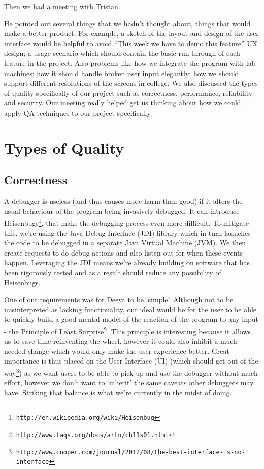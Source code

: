 \documentclass[11pt, a4paper]{article}
\begin{document}
Then we had a meeting with Tristan. 


He pointed out several things that we hadn't thought about, things that would make a better product. For example, a sketch of the layout and design of the user interface would be helpful to avoid ``This week we have to demo this feature'' UX design; a usage scenario which should contain the basic run through of each feature in the project. Also problems like how we integrate the program with lab machines; how it should handle broken user input elegantly; how we should support different resolutions of the screens in college. We also discussed the types of quality specifically of our project such as correctness, performance, reliability and security. Our meeting really helped get us thinking about how we could apply QA techniques to our project specifically.
\section{Types of Quality}	
\subsection{Correctness}
A debugger is useless (and thus causes more harm than good) if it alters the usual behaviour of the program being invasively debugged. It can introduce Heisenbugs\footnote{\tt{http://en.wikipedia.org/wiki/Heisenbug}}, that make the debugging process even more difficult. To mitigate this, we're using the Java Debug Interface (JDI) library which in turn launches the code to be debugged in a separate Java Virtual Machine (JVM). We then create requests to do debug actions and also listen out for when these events happen. Leveraging the JDI means we're already building on software that has been rigorously tested and as a result should reduce any possibility of Heisenbugs.

One of our requirements was for Deeva to be `simple'. Although not to be misinterpreted as lacking functionality, our ideal would be for the user to be able to quickly build a good mental model of the reaction of the program to any input - the Principle of Least Surprise\footnote{\tt{http://www.faqs.org/docs/artu/ch11s01.html}}. This principle is interesting because it allows us to save time reinventing the wheel, however it could also inhibit a much needed change which would only make the user experience better. Great importance is thus placed on the User Interface (UI) (which should get out of the way\footnote{\tt{http://www.cooper.com/journal/2012/08/the-best-interface-is-no-interface}}) as we want users to be able to pick up and use the debugger without much effort, however we don't want to `inherit' the same caveats other debuggers may have. Striking that balance is what we're currently in the midst of doing. 
\end{document}
